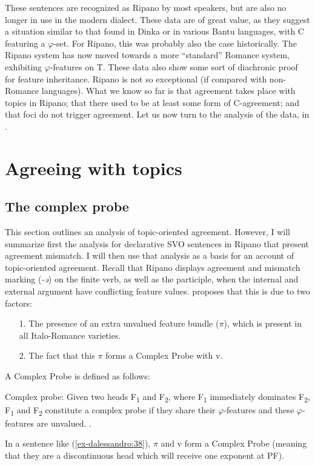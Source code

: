 \documentclass[output=paper
,modfonts
,nonflat]{langsci/langscibook}
\begin{document}
\noindent These sentences are recognized as Ripano by most speakers, but are also no longer in use in the modern dialect. 
These data are of great value, as they suggest a situation similar to that found in Dinka or in various Bantu languages, with C featuring a $\varphi $-set. For Ripano, this was probably also the case historically. The Ripano system has now moved towards a more ``standard'' Romance system, exhibiting $\varphi $-features on T.
These data also show some sort of diachronic proof for feature inheritance. Ripano is not so exceptional (if compared with non-Romance languages).
What we know so far is that agreement takes place with topics in Ripano; that there used to be at least some form of C-agreement; and that foci do not trigger agreement.
Let us now turn to the analysis of the data, in .


\section{Agreeing with topics} \label{sec-dalessandro:5}
\subsection{The complex probe}
This section outlines an analysis of topic-oriented agreement. However, I will summarize first the analysis for declarative SVO sentences in Ripano that present agreement mismatch. I will then use that analysis as a basis for an account of topic-oriented agreement.
Recall that Ripano displays agreement and mismatch marking (\textit{-ə}) on the finite verb, as well as the participle, when the internal and external argument have conflicting feature values. \citet{D`Alessandro2017} proposes that this is due to two factors:

\begin{enumerate}
\item[1.]The presence of an extra unvalued feature bundle ($\pi $), which is present in all Italo-Romance varieties.
\item[2.]The fact that this $\pi $ forms a Complex Probe with v. 
\end{enumerate}
A Complex Probe is defined as follows:

\begin{exe}
\ex	Complex probe: Given two heads F\textsubscript{1} and F\textsubscript{2}, where F\textsubscript{1} immediately dominates F\textsubscript{2}, F\textsubscript{1} and F\textsubscript{2} constitute a complex probe if they share their $\varphi $-features and these $\varphi $-features are unvalued. \citep[24]{D`Alessandro2017}.
\end{exe}
In a sentence like (\ref{ex-dalessandro:38}), $\pi $ and v form a Complex Probe (meaning that they are a discontinuous head which will receive one exponent at PF). 
\end{document}
